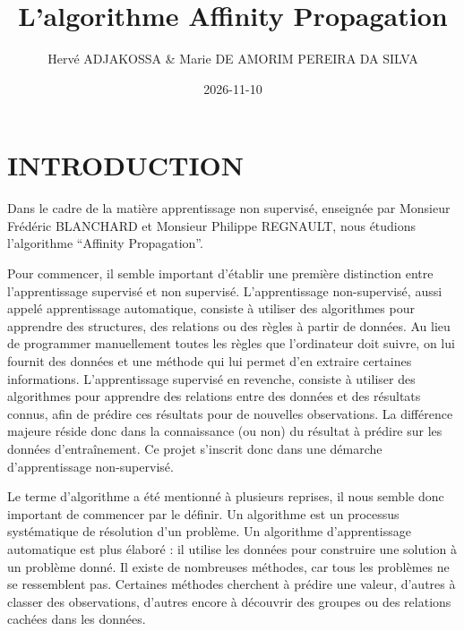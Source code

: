 \documentclass[11pt,a4paper]{memoirerecherche}
\title{L'algorithme Affinity Propagation}
\author{Hervé ADJAKOSSA \& Marie DE AMORIM PEREIRA DA SILVA}
\date{2026-11-10}
\begin{document}
\maketitle
\newpage

{
\setcounter{tocdepth}{3}
\tableofcontents
\newpage
}



\newpage

\section{INTRODUCTION}\label{introduction}

Dans le cadre de la matière apprentissage non supervisé, enseignée par
Monsieur Frédéric BLANCHARD et Monsieur Philippe REGNAULT, nous étudions
l'algorithme ``Affinity Propagation''.

Pour commencer, il semble important d'établir une première distinction
entre l'apprentissage supervisé et non supervisé. L'apprentissage
non-supervisé, aussi appelé apprentissage automatique, consiste à
utiliser des algorithmes pour apprendre des structures, des relations ou
des règles à partir de données. Au lieu de programmer manuellement
toutes les règles que l'ordinateur doit suivre, on lui fournit des
données et une méthode qui lui permet d'en extraire certaines
informations. L'apprentissage supervisé en revenche, consiste à utiliser
des algorithmes pour apprendre des relations entre des données et des
résultats connus, afin de prédire ces résultats pour de nouvelles
observations. La différence majeure réside donc dans la connaissance (ou
non) du résultat à prédire sur les données d'entraînement. Ce projet
s'inscrit donc dans une démarche d'apprentissage non-supervisé.

Le terme d'algorithme a été mentionné à plusieurs reprises, il nous
semble donc important de commencer par le définir. Un algorithme est un
processus systématique de résolution d'un problème. Un algorithme
d'apprentissage automatique est plus élaboré : il utilise les données
pour construire une solution à un problème donné. Il existe de
nombreuses méthodes, car tous les problèmes ne se ressemblent pas.
Certaines méthodes cherchent à prédire une valeur, d'autres à classer
des observations, d'autres encore à découvrir des groupes ou des
relations cachées dans les données.
\end{document}
